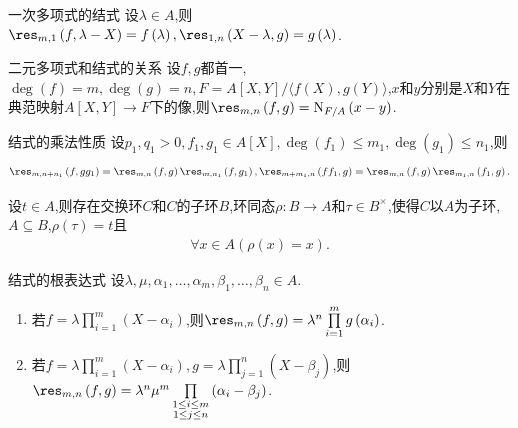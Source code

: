 \begin{corollary}{一次多项式的结式}{}
	设$\lambda\in A$,则$\res_{m,1}\left(f,\lambda-X\right)=f\left(\lambda\right),\res_{1,n}\left(X-\lambda,g\right)=g\left(\lambda\right)$.
\end{corollary}

\begin{proposition}{二元多项式和结式的关系}{}
	设$f,g$都首一,$\deg\left(f\right)=m,\deg\left(g\right)=n,F=A[X,Y]/\langle f\left(X\right),g\left(Y\right)\rangle$,$x$和$y$分别是$X$和$Y$在典范映射$A[X,Y]\to F$下的像,则$\res_{m,n}\left(f,g\right)=\mathrm{N}_{F/A}\left(x-y\right)$.
\end{proposition}

\begin{proposition}{结式的乘法性质}{}
	设$p_{1},q_{1}>0,f_{1},g_{1}\in A[X],\deg\left(f_{1}\right)\leq m_{1},\deg\left(g_{1}\right)\leq n_{1}$,则
	\begin{align*}
		\res_{m,n+n_{1}}\left(f,gg_{1}\right)=\res_{m,n}\left(f,g\right)\res_{m,n_{1}}\left(f,g_{1}\right),\res_{m+m_{1},n}\left(ff_{1},g\right)=\res_{m,n}\left(f,g\right)\res_{m_{1},n}\left(f_{1},g\right).
	\end{align*}
\end{proposition}

\begin{lemma}{}{}
	设$t\in A$,则存在交换环$C$和$C$的子环$B$,环同态$\rho:B\to A$和$\tau\in B^{\times}$,使得$C$以$A$为子环,$A\subseteq B$,$\rho\left(\tau\right)=t$且
	\begin{align*}
		\forall x\in A\left(\rho\left(x\right)=x\right).
	\end{align*}
\end{lemma}

\begin{corollary}{结式的根表达式}{}
	设$\lambda,\mu,\alpha_{1},\ldots,\alpha_{m},\beta_{1},\ldots,\beta_{n}\in A$.
	\begin{enumerate}
		\item 若$f=\lambda\prod\limits_{i=1}^{m}\left(X-\alpha_{i}\right)$,则$\res_{m,n}\left(f,g\right)=\lambda^{n}\prod\limits_{i=1}^{m}g\left(\alpha_{i}\right)$.
		\item 若$f=\lambda\prod\limits_{i=1}^{m}\left(X-\alpha_{i}\right),g=\lambda\prod\limits_{j=1}^{n}\left(X-\beta_{j}\right)$,则$\res_{m,n}\left(f,g\right)=\lambda^{n}\mu^{m}\prod\limits_{\substack{1\leq i\leq m\\ 1\leq j\leq n}}\left(\alpha_{i}-\beta_{j}\right)$.
	\end{enumerate}
\end{corollary}

